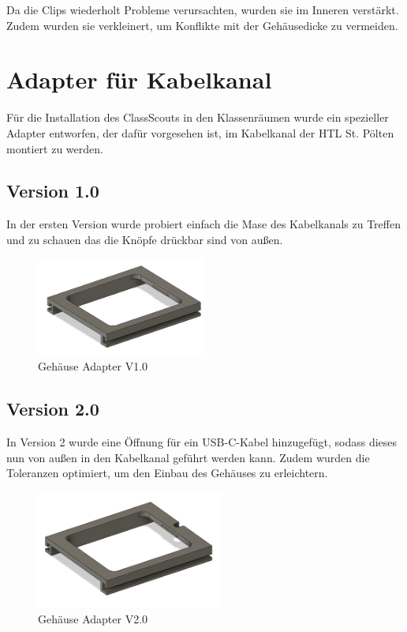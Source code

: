 \begin{inhalt}
Da die Clips wiederholt Probleme verursachten, wurden sie im Inneren verstärkt.  
Zudem wurden sie verkleinert, um Konflikte mit der Gehäusedicke zu vermeiden.


\newpage

\section{Adapter für Kabelkanal}

Für die Installation des ClassScouts in den Klassenräumen wurde ein spezieller Adapter entworfen, der dafür vorgesehen ist, im Kabelkanal der HTL St. Pölten montiert zu werden.


\subsection{Version 1.0}

In der ersten Version wurde probiert einfach die Mase des Kabelkanals zu Treffen und zu schauen das die Knöpfe drückbar sind von außen.

\begin{figure}[!htb]
\centering
\includegraphics[width=0.5\textwidth]{files/Thomas/pics/adapter/1.0/image.png}
\caption[Gehäuse Adapter V1.0]{Gehäuse Adapter V1.0}
\label{fig:gehaeuse_internet_bild}
\end{figure}


\subsection{Version 2.0}

In Version 2 wurde eine Öffnung für ein USB-C-Kabel hinzugefügt, sodass dieses nun von außen in den Kabelkanal geführt werden kann.  
Zudem wurden die Toleranzen optimiert, um den Einbau des Gehäuses zu erleichtern.


\begin{figure}[!htb]
\centering
\includegraphics[width=0.55\textwidth]{files/Thomas/pics/adapter/2.0/image.png}
\caption[Gehäuse Adapter V2.0]{Gehäuse Adapter V2.0}
\label{fig:gehaeuse_internet_bild}
\end{figure}




\end{inhalt}
